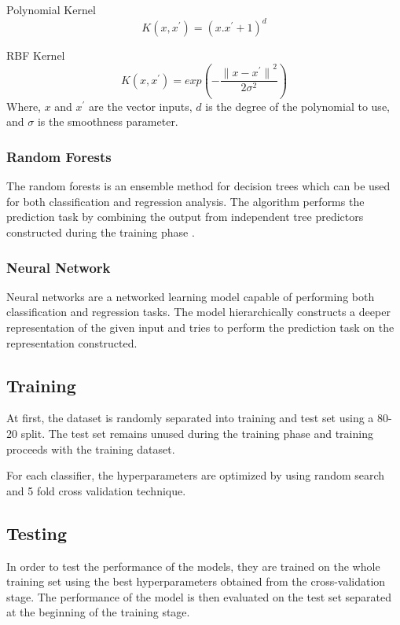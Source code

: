 Polynomial Kernel
\begin{equation}
    \label{eq:polynomial_kernel}
    K(x, x^{'}) = {(x.x^{'} + 1)}^{d}
\end{equation}

RBF Kernel
\begin{equation}
    \label{eq:rbf_kernel}
    K(x, x^{'}) = exp(- \frac{{\lVert x - x^{'} \rVert}^{2}}{2 \sigma^{2}})
\end{equation}
Where, $x$ and $x^{'}$ are the vector inputs, $d$ is the degree of the polynomial to use, and $\sigma$ is the smoothness parameter.

\subsubsection{Random Forests}
The random forests\cite{breiman2001random} is an ensemble method for decision trees\cite{quinlan1986induction} which can be used for both classification and regression analysis.  The algorithm performs the prediction task by combining the output from independent tree predictors constructed during the training phase \cite{breiman2001random}. 

\subsubsection{Neural Network}
Neural networks are a networked learning model capable of performing both classification and regression tasks. The model hierarchically constructs a deeper representation of the given input and tries to perform the prediction task on the representation constructed. 

\subsection{Training}
At first, the dataset is randomly separated into training and test set using a 80-20 split. The test set remains unused during the training phase and training proceeds with the training dataset.

For each classifier, the hyperparameters are optimized by using random search and 5 fold cross validation technique.

\subsection{Testing}
In order to test the performance of the models, they are trained on the whole training set using the best hyperparameters obtained from the cross-validation stage. The performance of the model is then evaluated on the test set separated at the beginning of the training stage.
